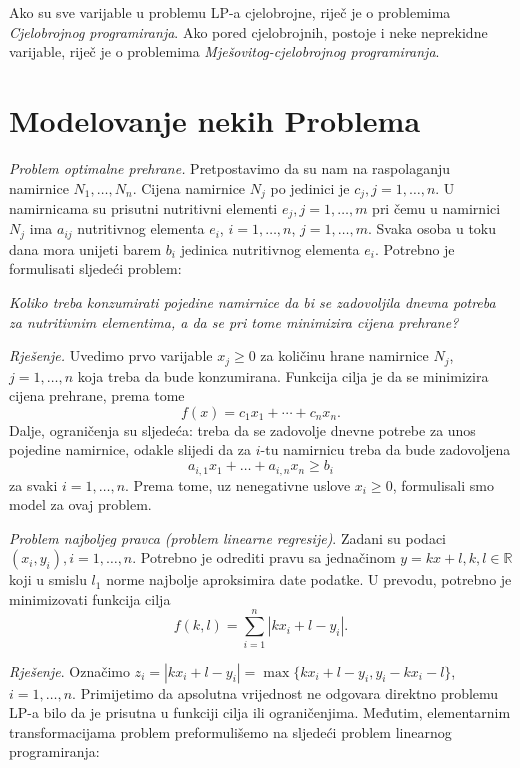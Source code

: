 \documentclass[a4paper, utf8, 11pt, colorlinks]{book}
\begin{document}
Ako su sve varijable u problemu LP-a cjelobrojne, riječ je o problemima \emph{Cjelobrojnog programiranja}. Ako pored cjelobrojnih, postoje i neke neprekidne varijable, riječ je o problemima \emph{Mješovitog-cjelobrojnog programiranja}. 

\section{Modelovanje nekih Problema}\label{sec:modeli_lp}

\emph{Problem optimalne prehrane.} Pretpostavimo da su nam na raspolaganju namirnice $N_1, \ldots, N_n$. Cijena namirnice $N_j$ po jedinici je $c_j, j = 1, \ldots, n$. U namirnicama su prisutni nutritivni elementi $e_j,j=1,\ldots,m$ pri čemu
u namirnici $N_j$ ima $a_{ij}$ nutritivnog elementa $e_i$, $i = 1, \ldots, n$, $j = 1, \ldots, m$. Svaka osoba u toku dana mora unijeti barem $b_i$
jedinica nutritivnog elementa $e_i$. Potrebno je formulisati
sljedeći problem: 

\emph{Koliko treba konzumirati pojedine namirnice da bi se zadovoljila dnevna
potreba za nutritivnim elementima, a da se pri tome minimizira cijena prehrane?}
 
 \emph{Rješenje.}  Uvedimo prvo varijable $x_j \geq 0$ za količinu hrane namirnice $N_j$, $j = 1, \ldots, n$ koja treba da bude konzumirana. Funkcija cilja je da se minimizira cijena prehrane, prema tome $$f(x) = c_1 x_1 + \cdots + c_n x_n.$$
 Dalje, ograničenja su sljedeća: treba da se zadovolje dnevne potrebe za unos pojedine namirnice, odakle slijedi da za $i$-tu namirnicu treba da bude zadovoljena 
 $$ a_{i,1} x_1 + \ldots + a_{i,n} x_n \geq b_i $$
 za svaki $i=1,\ldots,n$. Prema tome, uz nenegativne uslove $x_i \geq 0$, formulisali smo model za ovaj problem.  
 
\emph{Problem najboljeg pravca (problem linearne regresije)}. Zadani su podaci $(x_i, y_i), i = 1, \ldots , n$. Potrebno je odrediti pravu sa jednačinom $y = k x + l,
k, l \in \mathbb{R}$ koji u smislu $l_1$ norme najbolje aproksimira date podatke. U prevodu, potrebno je minimizovati  funkcija cilja $$f(k, l) = \sum_{i=1}^n |k x_i + l - y_i|.$$

\emph{Rješenje}.
Označimo $z_i = |k x_i + l - y_i| = \max\{k x_i + l - y_i, y_i - k x_i - l \}$, $i=1,\ldots,n$. 
Primijetimo da apsolutna vrijednost ne odgovara direktno problemu LP-a bilo da je prisutna u funkciji cilja ili ograničenjima. Međutim, elementarnim transformacijama problem preformulišemo na sljedeći  problem linearnog programiranja:
\end{document}
